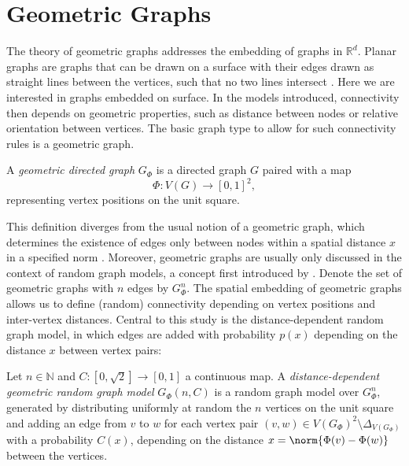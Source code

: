 






\section{Geometric Graphs}\label{sec:geometric_graphs} 


The theory of geometric graphs addresses the embedding of graphs in
$\mathbb{R}^d$.  Planar graphs are graphs that can be drawn on a
surface with their edges drawn as straight lines between the vertices,
such that no two lines intersect
\parencite{Diestel_Graph-theory}. %
Here we are interested in graphs embedded on surface. In the models
introduced, connectivity then depends on geometric properties, such as
distance between nodes or relative orientation between vertices. The
basic graph type to allow for such connectivity rules is a geometric
graph.

\begin{definition}
  A \textit{geometric directed graph}
  $G_{\Phi}$ is a directed graph $G$ paired with a map
  \[
    \Phi:V(G) \to [0,1]^2,
  \]
  representing vertex positions on the unit square.
\end{definition}

This definition diverges from the usual notion of a geometric graph,
which determines the existence of edges only between nodes within a
spatial distance $x$ in a specified
norm \parencite{Penrose_Geometric-graph}. Moreover, geometric graphs
are usually only discussed in the context of random graph models, a
concept first introduced by \textcite{Gilbert1961}. Denote the set of
geometric graphs with $n$ edges by $G_{\Phi}^n$. The spatial embedding
of geometric graphs allows us to define (random) connectivity
depending on vertex positions and inter-vertex distances.  Central to
this study is the distance-dependent random graph model, in which
edges are added with probability $p(x)$ depending on the distance $x$
between vertex pairs:

\begin{definition}
  \label{def:distance_dependent_graph}
  Let $n \in \mathbb{N}$ and $C: [0,\sqrt{2}] \to [0,1]$ a
  continuous %
  map.  A \textit{distance-dependent geometric random graph model}
  $G_{\Phi}(n,C)$ is a random graph model over $G^n_{\Phi}$, generated
  by distributing uniformly at random the $n$ vertices on the unit
  square and adding an edge from $v$ to $w$ for each vertex pair $(v,w) \in
  {V(G_{\Phi})}^2 \setminus \Delta_{V(G_{\Phi})}$ with a
  probability $C(x)$, depending on the distance $x = \norm{\Phi(v) -
    \Phi(w)}$ between the vertices.
\end{definition}

